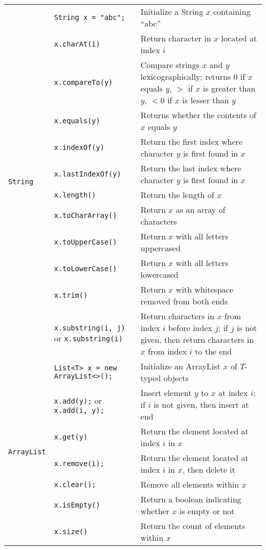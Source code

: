 \documentclass{article}
\begin{document}
\begin{center}
\begin{tabularx}{\textwidth}{llX}
\multirow{12}{*}[-0.5em]{\lstinline|String|} & \lstinline|String x = "abc";| & Initialize a String \(x\) containing \enquote{abc}\\
& \lstinline|x.charAt(i)| & Return character in \(x\) located at index \(i\)\\
& \lstinline|x.compareTo(y)| & Compare strings \(x\) and \(y\) lexicographically; returns \(0\) if \(x\) equals \(y\), \(>\) if \(x\) is greater than \(y\), \(<0\) if \(x\) is lesser than \(y\)\\
& \lstinline|x.equals(y)| & Returns whether the contents of \(x\) equals \(y\)\\
& \lstinline|x.indexOf(y)| & Return the first index where character \(y\) is first found in \(x\)\\
& \lstinline|x.lastIndexOf(y)| & Return the last index where character \(y\) is first found in \(x\)\\
& \lstinline|x.length()| & Return the length of \(x\)\\
& \lstinline|x.toCharArray()| & Return \(x\) as an array of characters\\
& \lstinline|x.toUpperCase()| & Return \(x\) with all letters uppercased\\
& \lstinline|x.toLowerCase()| & Return \(x\) with all letters lowercased\\
& \lstinline|x.trim()| & Return \(x\) with whitespace removed from both ends\\
& \lstinline|x.substring(i, j)| or \lstinline|x.substring(i)| & Return characters in \(x\) from index \(i\) before index \(j\); if \(j\) is not given, then return characters in \(x\) from index \(i\) to the end\\\midrule
\multirow{7}{*}[-0.5em]{\lstinline|ArrayList|} & \lstinline|List<T> x = new ArrayList<>();| & Initialize an ArrayList \(x\) of \(T\)-typed objects\\
& \lstinline|x.add(y);| or \lstinline|x.add(i, y);| & Insert element \(y\) to \(x\) at index \(i\); if \(i\) is not given, then insert at end\\
& \lstinline|x.get(y)| & Return the element located at index \(i\) in \(x\) \\
& \lstinline|x.remove(i);| & Return the element located at index \(i\) in \(x\), then delete it\\
& \lstinline|x.clear();| & Remove all elements within \(x\)\\
& \lstinline|x.isEmpty()| & Return a boolean indicating whether \(x\) is empty or not\\
& \lstinline|x.size()| & Return the count of elements within \(x\)\\\midrule


\end{tabularx}
\end{center}
\end{document}
